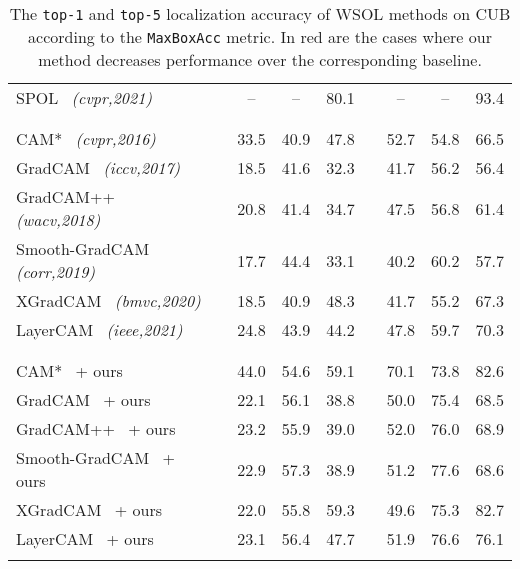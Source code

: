 \documentclass[twocolumn]{article}
\newcommand\maxboxacc{\texttt{MaxBoxAcc}\xspace}
\newcommand\topone{\texttt{top-1}\xspace}
\newcommand\topfive{\texttt{top-5}\xspace}
\theoremstyle{definition}
\newcommand\red[1]{{\color{red}#1}}
\begin{document}
{\begin{table}[ht!]
{\begin{tabular}{lc*{3}{c}c*{3}{c}}
SPOL~\cite{wei2021shallowspol} {\small \emph{(cvpr,2021)}}&  &         --   & -- & 80.1  &  & -- & -- & 93.4  \\
\cline{1-1}\cline{3-5}\cline{7-9}\\
\cline{1-1}\cline{3-5}\cline{7-9}\\
CAM*~\cite{zhou2016learning} {\small \emph{(cvpr,2016)}} &  &    33.5 & 40.9 & 47.8  &  & 52.7 & 54.8 & 66.5  \\
GradCAM~\cite{SelvarajuCDVPB17iccvgradcam} {\small \emph{(iccv,2017)}}  &  &                        18.5 & 41.6 & 32.3  &  & 41.7 & 56.2 & 56.4  \\
GradCAM++~\cite{ChattopadhyaySH18wacvgradcampp} {\small \emph{(wacv,2018)}} &  &                       20.8 & 41.4 & 34.7  &  & 47.5 & 56.8 & 61.4  \\
Smooth-GradCAM~\cite{omeiza2019corr} {\small \emph{(corr,2019)}}  &  &                 17.7 & 44.4 & 33.1  &  & 40.2 & 60.2 & 57.7 \\
XGradCAM~\cite{fu2020axiom} {\small \emph{(bmvc,2020)}} &  &                        18.5 & 40.9 & 48.3  &  & 41.7 & 55.2 & 67.3  \\
LayerCAM~\cite{JiangZHCW21layercam} {\small \emph{(ieee,2021)}}  &  &                       \red{24.8} & 43.9 & 44.2  &  & 47.8 & 59.7 & 70.3 \\
\cline{1-1}\cline{3-5}\cline{7-9}\\
\cline{1-1}\cline{3-5}\cline{7-9}\\
CAM*~\cite{zhou2016learning} + ours &  &    44.0 & 54.6 & 59.1  &  & 70.1 & 73.8 & 82.6  \\
GradCAM~\cite{SelvarajuCDVPB17iccvgradcam} + ours &  &                         22.1 & 56.1 & 38.8  &  & 50.0 & 75.4 & 68.5  \\
GradCAM++~\cite{ChattopadhyaySH18wacvgradcampp} + ours &  &                       23.2 & 55.9 & 39.0  &  & 52.0 & 76.0 & 68.9  \\
Smooth-GradCAM~\cite{omeiza2019corr}  + ours &  &                  22.9 & 57.3 & 38.9  &  & 51.2 & 77.6 & 68.6 \\
XGradCAM~\cite{fu2020axiom} + ours &  &                        22.0 & 55.8 & 59.3  &  & 49.6 & 75.3 & 82.7  \\
LayerCAM~\cite{JiangZHCW21layercam} + ours &  &                        \red{23.1} & 56.4 & 47.7  &  & 51.9 & 76.6 & 76.1 \\
\cline{1-1}\cline{3-5}\cline{7-9}\\
\end{tabular}
}
\caption{The \topone and \topfive localization accuracy of WSOL methods on CUB according to the \maxboxacc metric. In \red{red} are the cases where our method decreases performance over the corresponding baseline.}
\label{tab:top15}
\end{table}
}
\end{document}
